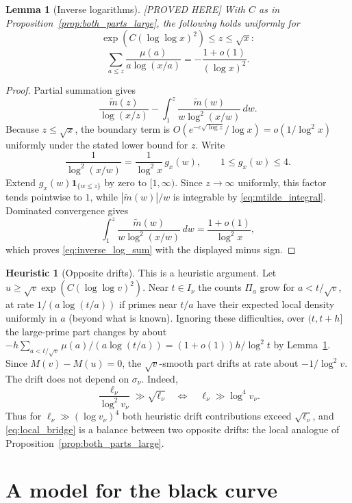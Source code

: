 \documentclass[11pt]{amsart}
\numberwithin{equation}{section}
\theoremstyle{plain}
\newtheorem{lemma}[theorem]{Lemma}
\theoremstyle{definition}
\newtheorem{heuristic}[theorem]{Heuristic}
\theoremstyle{remark}
\newcommand{\mt}{\widetilde{m}}
\begin{document}
\begin{lemma}[Inverse logarithms]
\label{lem:inverse_log_sum}
\emph{[PROVED HERE]} With $C$ as in
Proposition~\ref{prop:both_parts_large}, the following holds uniformly for
\[
\exp(C(\log\log x)^2)\le z\le\sqrt x:
\]
\begin{equation}
\label{eq:inverse_log_sum}
  \sum_{a\le z}\frac{\mu(a)}{a\log(x/a)}=-\frac{1+o(1)}{(\log x)^2}.
\end{equation}
\end{lemma}

\begin{proof}
Partial summation gives
\[
\frac{\mt(z)}{\log(x/z)}-
\int_1^z\frac{\mt(w)}{w\log^2(x/w)}\,dw.
\]
Because $z\le\sqrt x$, the boundary term is
$O(e^{-c\sqrt{\log z}}/\log x)=o(1/\log^2x)$ uniformly under the stated
lower bound for $z$.  Write
\[
\frac1{\log^2(x/w)}=\frac1{\log^2x}\,g_x(w),\qquad
1\le g_x(w)\le4.
\]
Extend $g_x(w)\mathbf1_{\{w\le z\}}$ by zero to $[1,\infty)$.  Since
$z\to\infty$ uniformly, this factor tends pointwise to $1$, while
$|\mt(w)|/w$ is integrable by \eqref{eq:mtilde_integral}.  Dominated
convergence gives
\[
\int_1^z\frac{\mt(w)}{w\log^2(x/w)}\,dw
=\frac{1+o(1)}{\log^2x},
\]
which proves \eqref{eq:inverse_log_sum} with the displayed minus sign.
\end{proof}

\begin{heuristic}[Opposite drifts]
\label{heu:local_drift}
This is a heuristic argument. Let $u\ge\sqrt v\exp(C(\log\log v)^2)$. Near
$t\in I_\nu$ the counts $\Pi_a$ grow for $a<t/\sqrt v$, at rate
$1/(a\log(t/a))$ if primes near $t/a$ have their expected local density
uniformly in $a$ (beyond what is known). Ignoring these difficulties, over
$(t,t+h]$ the large-prime part changes by about
$-h\sum_{a<t/\sqrt v}\mu(a)/(a\log(t/a))=(1+o(1))h/\log^2t$ by
Lemma~\ref{lem:inverse_log_sum}. Since $M(v)-M(u)=0$, the
$\sqrt v$-smooth part drifts at rate about $-1/\log^2v$. The drift does not
depend on $\sigma_\nu$. Indeed,
\[
\frac{\ell_\nu}{\log^2v_\nu}\gg\sqrt{\ell_\nu}
\quad\Longleftrightarrow\quad
\ell_\nu\gg\log^4v_\nu.
\]
Thus for $\ell_\nu\gg(\log v_\nu)^4$ both heuristic drift contributions
exceed $\sqrt{\ell_\nu}$, and \eqref{eq:local_bridge} is a balance between two
opposite drifts: the local analogue of
Proposition~\ref{prop:both_parts_large}.
\end{heuristic}

\section{A model for the black curve}
\label{sec:model}
\end{document}
